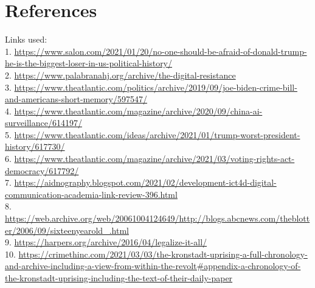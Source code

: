 \documentclass[12pt]{article}
\begin{document}
\section*{References}
Links used: \\
1. \url{https://www.salon.com/2021/01/20/no-one-should-be-afraid-of-donald-trump-he-is-the-biggest-loser-in-us-political-history/}  \\
2.  \url{https://www.palabranahj.org/archive/the-digital-resistance}  \\
3. \url{https://www.theatlantic.com/politics/archive/2019/09/joe-biden-crime-bill-and-americans-short-memory/597547/}   \\
4. \url{https://www.theatlantic.com/magazine/archive/2020/09/china-ai-surveillance/614197/} \\
5. \url{https://www.theatlantic.com/ideas/archive/2021/01/trump-worst-president-history/617730/}  \\
6. \url{https://www.theatlantic.com/magazine/archive/2021/03/voting-rights-act-democracy/617792/}  \\
7. \url{https://aidnography.blogspot.com/2021/02/development-ict4d-digital-communication-academia-link-review-396.html}  \\
8. \url{https://web.archive.org/web/20061004124649/http://blogs.abcnews.com/theblotter/2006/09/sixteenyearold_.html}  \\
9. \url{https://harpers.org/archive/2016/04/legalize-it-all/}  \\
10. \url{https://crimethinc.com/2021/03/03/the-kronstadt-uprising-a-full-chronology-and-archive-including-a-view-from-within-the-revolt#appendix-a-chronology-of-the-kronstadt-uprising-including-the-text-of-their-daily-paper}  \\
 
\end{document}
